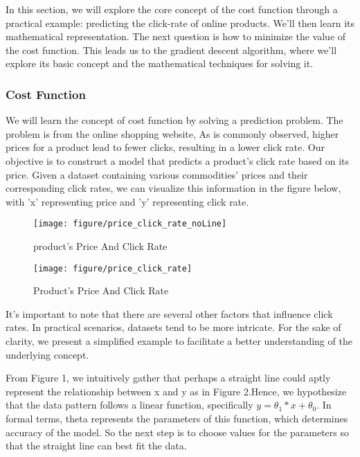 \documentclass{article}
\begin{document}
    In this section, we will explore the core concept of the cost function through a practical example: predicting the click-rate of online products. We'll then learn its mathematical representation. The next question is how to minimize the value of the cost function. This leads us to the gradient descent algorithm, where we'll explore its basic concept and the mathematical techniques for solving it. 


    \newpage
	\subsubsection{Cost Function}
     We will learn the concept of cost function by solving a prediction problem. The problem is from the online shopping website, As is commonly observed, higher prices for a product lead to fewer clicks, resulting in a lower click rate. Our objective is to construct a model that predicts a product's click rate based on its price. Given a dataset containing various commodities' prices and their corresponding click rates, we can visualize this information in the figure below, with 'x' representing price and 'y' representing click rate.


     \begin{figure}[htbp]
        \centering
        \texttt{[image: figure/price\_click\_rate\_noLine]}
        \caption{product's Price And Click Rate}
     \end{figure}

     \begin{figure}[htbp]
        \centering
        \texttt{[image: figure/price\_click\_rate]}
        \caption{Product's Price And Click Rate}
     \end{figure}

     It's important to note that there are several other factors that influence click rates. In practical scenarios, datasets tend to be more intricate. For the sake of clarity, we present a simplified example to facilitate a better understanding of the underlying concept.

     From Figure 1,  we intuitively gather that perhaps a straight line could aptly represent the relationship between x and y as in Figure 2.Hence, we hypothesize that the data pattern follows a linear function, specifically $ y = \theta_{1} * x  + \theta_{0}$. In formal terms, theta represents the parameters of this function, which determines accuracy of the model.  So the next step is to choose values for the parameters so that the straight line can best fit the data.
\end{document}
